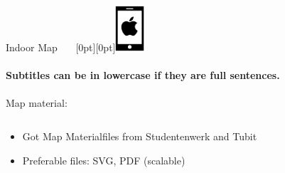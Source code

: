 \documentclass[11pt]{beamer}
\begin{document}
\begin{frame}{Indoor Map ~~~\raisebox{-10pt}[0pt][0pt]{\includegraphics[width=0.08\textwidth]{tech-stack-apple}}}

\framesubtitle{Subtitles can be in lowercase if they are full sentences.}
Map material:

  \begin{columns}[T]
  \begin{column}{.6\textwidth}
  \begin{itemize}
    \item Got Map Materialfiles from Studentenwerk and Tubit
    \item Preferable files: SVG, PDF (scalable)
  \end{itemize}
  \end{column}
  \begin{column}{.4\textwidth}

\end{column}
\end{columns}
\end{frame}
\end{document}
